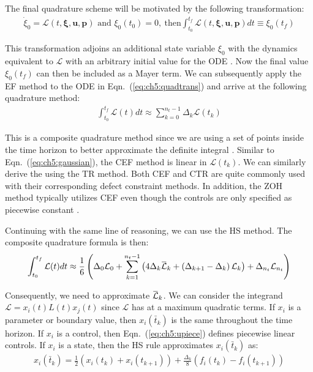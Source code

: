 The final quadrature scheme will be motivated by the following transformation:
\begin{align} \label{eq:ch5:quadtrans}
\dot{\xi}_0 = \mathcal{L}\left(t,\bm{\xi},\bm{u},\bm{p}\right) \text{ and } \xi_0(t_0) = 0, \ \text{then} \int_{t_0}^{t_f} \mathcal{L}\left(t,\bm{\xi},\bm{u},\bm{p}\right) dt \equiv \xi_0(t_f)
\end{align}

\noindent This transformation adjoins an additional state variable $\xi_0$ with the dynamics equivalent to $\mathcal{L}$ with an arbitrary initial value for the ODE \cite{Liberzon2012a}.
Now the final value $\xi_0(t_f)$ can then be included as a Mayer term.
We can subsequently apply the EF method to the ODE in Eqn.~(\ref{eq:ch5:quadtrans}) and arrive at the following  quadrature method:
\begin{align}
\int_{t_0}^{t_f} \mathcal{L}\left(t\right) dt \approx \sum_{k=0}^{n_t-1} \Delta_k \mathcal{L}(t_k)
\end{align}

\noindent This is a composite quadrature method since we are using a set of points inside the
time horizon to better approximate the definite integral \cite{Heath2002a}.
Similar to Eqn.~(\ref{eq:ch5:gaussian}), the CEF method is linear in $\mathcal{L}(t_k)$.
We can similarly derive the  using the TR method.
Both CEF and CTR are quite commonly used with their corresponding defect constraint methods.
In addition, the ZOH method typically utilizes CEF even though the controls are only specified as piecewise constant \cite{Borrelli2015a, Hals2011a}.

Continuing with the same line of reasoning, we can use the HS method.
The composite quadrature formula is then:
\begin{align}
\int_{t_0}^{t_f} \mathcal{L}(t) dt \approx \frac{1}{6} \left( \Delta_0 \mathcal{L}_0 +
\sum_{k=1}^{n_t-1} \left( 4 \Delta_k \myoverbar{\mathcal{L}}_k + \left( \Delta_{k+1} - \Delta_{k} \right) \mathcal{L}_{k} \right) +
\Delta_{n_t} \mathcal{L}_{n_t} \right)
\end{align}

\noindent Consequently, we need to approximate $\myoverbar{\mathcal{L}}_k$.
We can consider the integrand $\mathcal{L} = x_i(t) L(t) x_j(t)$ since $\mathcal{L}$ has at a maximum quadratic terms.
If $x_i$ is a parameter or boundary value, then $x_{i}(\bar{t}_k)$ is the same throughout the time horizon.
If $x_i$ is a control, then Eqn.~(\ref{eq:ch5:upiece}) defines piecewise linear controls.
If $x_i$ is a state, then the HS rule approximates $x_{i}(\bar{t}_k)$ as:
\begin{align} \label{eq:ch5:xhs}
x_{i}(\bar{t}_k) = \frac{1}{2} \left( {x}_{i}(t_k) + {x}_{i}(t_{k+1})  \right) + \frac{\Delta_k}{8} \left( {f}_{i}(t_k) - {f}_{i}(t_{k+1}) \right)
\end{align}

